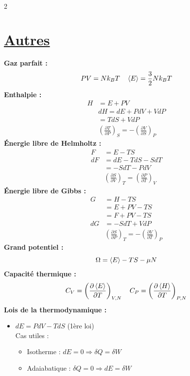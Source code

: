 \documentclass[11pt]{article}
\begin{document}
\begin{multicols}{2}
\section{\underline{Autres}}
\textbf{Gaz parfait :}
\begin{equation*}
  PV = N k_B T \quad \braket{E}=\frac{3}{2}Nk_BT  
\end{equation*}
\textbf{Enthalpie :}
\begin{align*}
  H &= E + PV\\
  &dH = dE + P dV + V dP\\
  &= T dS + V dP\\
  &\left( \frac{\partial T}{\partial P} \right)_S = -\left( \frac{\partial V}{\partial S} \right)_P
\end{align*}
\textbf{Énergie libre de Helmholtz :}
\begin{align*}
  F &= E - TS\\
  dF &= dE - T dS - S dT\\
  &= -S dT - P dV\\
  &\left( \frac{\partial S}{\partial V} \right)_T=\left( \frac{\partial P}{\partial T} \right)_V
\end{align*}
\textbf{Énergie libre de Gibbs :}
\begin{align*}
  G &= H - TS\\
  &=E+PV-TS\\
  &=F+PV-TS\\
  dG &= -SdT+VdP\\
  &\left( \frac{\partial S}{\partial P} \right)_T = -\left( \frac{\partial V}{\partial T} \right)_P
\end{align*}
\textbf{Grand potentiel :}
\begin{equation*}
  \Omega = \braket{E}-TS-\mu N
\end{equation*}
\textbf{Capacité thermique :}
\begin{equation*}
  C_V = \left( \frac{\partial \braket{E}}{\partial T} \right)_{V, N} \quad C_P = \left( \frac{\partial \braket{H}}{\partial T} \right)_{P, N}
\end{equation*}
\textbf{Lois de la thermodynamique :}
\begin{itemize}
  \item $\boxed{dE = PdV - TdS}$ (1ère loi)\\
        Cas utiles : \begin{itemize}
          \item Isotherme : $dE=0 \Rightarrow \delta Q = \delta W$
          \item Adaiabatique : $\delta Q = 0 \Rightarrow dE = \delta W$

\end{itemize}
\end{itemize}
\end{multicols}
\end{document}
